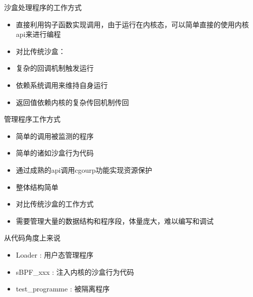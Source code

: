 \documentclass[UTF8,fontset=macnew,xcolor=table]{ctexbeamer}
\begin{document}
\begin{frame}{沙盒处理程序的工作方式}

    \begin{itemize}
        \item 直接利用钩子函数实现调用，由于运行在内核态，可以简单直接的使用内核api来进行编程\\

        \item 对比传统沙盒：
        \item 复杂的回调机制触发运行
        \item 依赖系统调用来维持自身运行
        \item 返回值依赖内核的复杂传回机制传回
    \end{itemize}
    
\end{frame}

\begin{frame}{管理程序工作方式}

    \begin{itemize}
        \item 简单的调用被监测的程序
        \item 简单的诸如沙盒行为代码
        \item 通过成熟的api调用cgourp功能实现资源保护
        \item 整体结构简单\\
        
        \item 对比传统沙盒的工作方式
        \item 需要管理大量的数据结构和程序段，体量庞大，难以编写和调试
    \end{itemize}
    
\end{frame}

\begin{frame}{从代码角度上来说}

    \begin{itemize}
        \item {\ttfamily Loader} : 用户态管理程序

        \item {\ttfamily sBPF\_xxx} : 注入内核的沙盒行为代码 
        
        \item {\ttfamily test\_programme} : 被隔离程序
    \end{itemize}
    
\end{frame}
\end{document}
